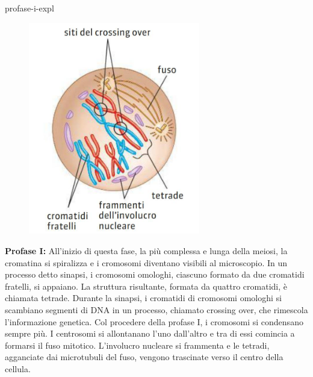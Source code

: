 \documentclass[preview]{standalone}
\begin{document}
\begin{snippet}{profase-i-expl}
    \setlength{\intextsep}{0pt}%
    \begin{figure}
        \includegraphics[width=7.5cm]{./resources/profase-i.png}
        \vspace{-1cm}
    \end{figure}

    \textbf{Profase I:}
    All'inizio di questa fase, la più complessa e lunga della meiosi, la cromatina si spiralizza e i
    cromosomi diventano visibili al microscopio. In un processo detto sinapsi, i cromosomi
    omologhi, ciascuno formato da due cromatidi fratelli, si appaiano. La struttura risultante,
    formata da quattro cromatidi, è chiamata tetrade. Durante la sinapsi, i cromatidi di
    cromosomi omologhi si scambiano segmenti di DNA in un processo, chiamato crossing over,
    che rimescola l'informazione genetica. Col procedere della profase I, i cromosomi si
    condensano sempre più. I centrosomi si allontanano l'uno dall'altro e tra di essi comincia a
    formarsi il fuso mitotico. L'involucro nucleare si frammenta e le tetradi, agganciate dai
    microtubuli del fuso, vengono trascinate verso il centro della cellula.
    \wrapfill
\end{snippet}
\end{document}
